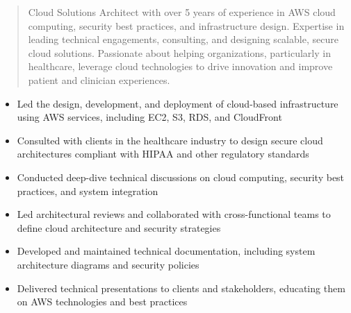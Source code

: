 



\makecvheader

\begin{quote}
  \noindent
  Cloud Solutions Architect with over 5 years of experience in AWS cloud computing, security best practices, and infrastructure design. Expertise in leading technical engagements, consulting, and designing scalable, secure cloud solutions. Passionate about helping organizations, particularly in healthcare, leverage cloud technologies to drive innovation and improve patient and clinician experiences.
\end{quote}

\par\smallskip
\noindent
\begin{minipage}{20cm}
  \begin{minipage}{9.75cm}
    \begin{itemize}
      \item Led the design, development, and deployment of cloud-based infrastructure using AWS services, including EC2, S3, RDS, and CloudFront
      \item Consulted with clients in the healthcare industry to design secure cloud architectures compliant with HIPAA and other regulatory standards
      \item Conducted deep-dive technical discussions on cloud computing, security best practices, and system integration
    \end{itemize}
  \end{minipage}
  \hfill
  \begin{minipage}{9.75cm}
    \begin{itemize}
      \item Led architectural reviews and collaborated with cross-functional teams to define cloud architecture and security strategies
      \item Developed and maintained technical documentation, including system architecture diagrams and security policies
      \item Delivered technical presentations to clients and stakeholders, educating them on AWS technologies and best practices
    \end{itemize}
  \end{minipage}
\end{minipage}
\par\smallskip
\divider

